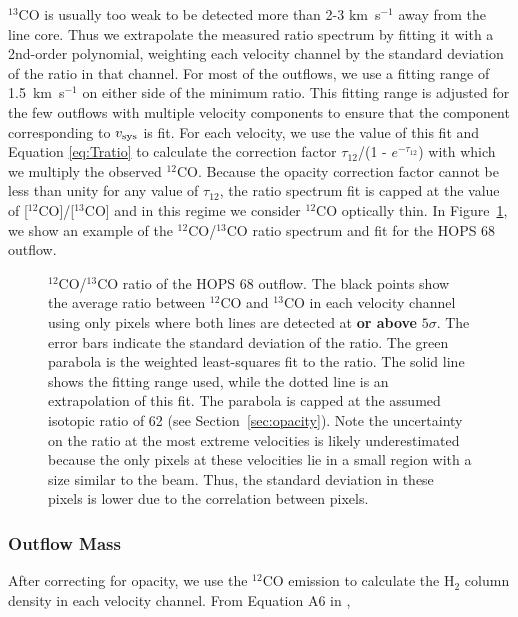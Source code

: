 \documentclass[twocolumn]{aastex63}
\newcommand{\example}{HOPS 68}
\newcommand{\kms}{km~s$^{-1}$}
\newcommand{\co}[1][]{\ensuremath{^{#1}}CO}
\begin{document}
\co[13]{} is usually too weak to be detected more than 2-3 \kms{} away from the line core. Thus we extrapolate the measured ratio spectrum by fitting it with a 2nd-order polynomial, weighting each velocity channel by the standard deviation of the ratio in that channel. For most of the outflows, we use a fitting range of 1.5~\kms{} on either side of the minimum ratio. This fitting range is adjusted for the few outflows with multiple velocity components to ensure that the component corresponding to $v_{\rm sys}$ is fit. For each velocity, we use the value of this fit and Equation \ref{eq:Tratio} to calculate the correction factor $\tau_{12}$/(1 - $e^{-\tau_{12}}$) with which we multiply the observed \co[12]{}. Because the opacity correction factor cannot be less than unity for any value of $\tau_{12}$, the ratio spectrum fit is capped at the value of [\co[12]]/[\co[13]] and in this regime we consider \co[12]{} optically thin. In Figure~\ref{fig:opacity}, we show an example of the \co[12]{}/\co[13]{} ratio spectrum and fit for the \example{} outflow. 

\begin{figure}
\caption{\co[12]{}/\co[13]{} ratio of the \example{} outflow. The black points show the average ratio between \co[12]{} and \co[13]{} in each velocity channel using only pixels where both lines are detected at \textbf{or above} $5\sigma$. The error bars indicate the standard deviation of the ratio. The green parabola is the weighted least-squares fit to the ratio. The solid line shows the fitting range used, while the dotted line is an extrapolation of this fit. The parabola is capped at the assumed isotopic ratio of 62 (see Section~\ref{sec:opacity}). Note the uncertainty on the ratio at the most extreme velocities is likely underestimated because the only pixels at these velocities lie in a small region with a size similar to the beam. Thus, the standard deviation in these pixels is lower due to the correlation between pixels.\label{fig:opacity}}
\end{figure}

\subsubsection{Outflow Mass}\label{sec:dmdv}
After correcting for opacity, we use the \co[12]{} emission to calculate the H$_2$ column density in each velocity channel. From Equation A6 in \citet{ZhangY16},
\end{document}

